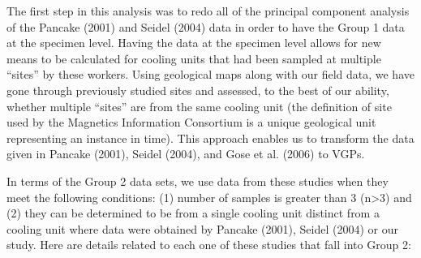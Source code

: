 \documentclass{article}
\begin{document}
The first step in this analysis was to redo all of the principal
component analysis of the Pancake (2001) and Seidel (2004) data in order
to have the Group 1 data at the specimen level. Having the data at the
specimen level allows for new means to be calculated for cooling units
that had been sampled at multiple ``sites'' by these workers. Using
geological maps along with our field data, we have gone through
previously studied sites and assessed, to the best of our ability,
whether multiple ``sites'' are from the same cooling unit (the
definition of site used by the Magnetics Information Consortium is a
unique geological unit representing an instance in time). This approach
enables us to transform the data given in Pancake (2001), Seidel (2004),
and Gose et al. (2006) to VGPs.

In terms of the Group 2 data sets, we use data from these studies when
they meet the following conditions: (1) number of samples is greater
than 3 (n\textgreater{}3) and (2) they can be determined to be from a
single cooling unit distinct from a cooling unit where data were
obtained by Pancake (2001), Seidel (2004) or our study. Here are details
related to each one of these studies that fall into Group 2:
\end{document}
